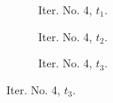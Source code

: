 \documentclass[a4paper,12pt]{amsart}
\numberwithin{equation}{section}
\begin{document}
\begin{figure}[h!]
\begin{subfigure}[t]{0.23\textwidth}
    \caption{Iter. No. 4, $t_1$.}
\end{subfigure}
	\hfill
\begin{subfigure}[t]{0.23\textwidth}
    \caption{Iter. No. 4, $t_2$.}
\end{subfigure}
	\hfill
\begin{subfigure}[t]{0.23\textwidth}
    \caption{Iter. No. 4, $t_3$.}
\end{subfigure}
	

\end{figure}
\end{document}
